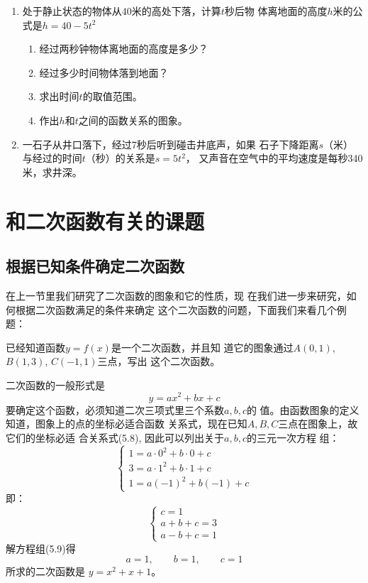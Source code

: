 \begin{enumerate}
\item 处于静止状态的物体从40米的高处下落，计算$t$秒后物
体离地面的高度$h$米的公式是$h=40-5t^2$
\begin{enumerate}
    \item 经过两秒钟物体离地面的高度是多少？
    \item 经过多少时间物体落到地面？
    \item 求出时间$t$的取值范围。
    \item 作出$h$和$t$之间的函数关系的图象。
\end{enumerate}

\item 一石子从井口落下，经过7秒后听到碰击井底声，如果
石子下降距离$s$（米）与经过的时间$t$（秒）的关系是$s=5t^2$，
又声音在空气中的平均速度是每秒340米，求井深。
\end{enumerate}

\section{和二次函数有关的课题}
\subsection{根据已知条件确定二次函数}
在上一节里我们研究了二次函数的图象和它的性质，现
在我们进一步来研究，如何根据二次函数满足的条件来确定
这个二次函数的问题，下面我们来看几个例题：


\begin{example}
    已经知道函数$y=f(x)$是一个二次函数，并且知
道它的图象通过$A(0,1)$, $B(1,3)$, $C(-1,1)$三点，写出
这个二次函数。
\end{example}

\begin{solution}
二次函数的一般形式是
\begin{equation}
    y=ax^2+bx+c
\end{equation}
要确定这个函数，必须知道二次三项式里三个系数$a,b,c$的
值。由函数图象的定义知道，图象上的点的坐标必适合函数
关系式，现在已知$A,B,C$三点在图象上，故它们的坐标必适
合关系式(5.8), 因此可以列出关于$a,b,c$的三元一次方程
组：
\[\begin{cases}
    1=a\cdot 0^2+b\cdot 0+c\\
3=a\cdot 1^2+b\cdot 1+c\\
1=a(-1)^2+b(-1)+c
\end{cases}\]
即：
\begin{equation}
    \begin{cases}
        c=1\\
a+b+c=3\\
a-b+c=1
    \end{cases}
\end{equation}
解方程组(5.9)得
\[a=1,\qquad b=1,\qquad c=1\]
所求的二次函数是
$y=x^2+x+1$。
\end{solution}
    

